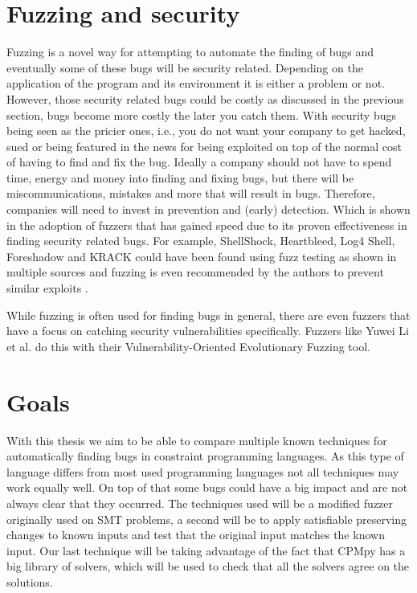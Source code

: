 \section{Fuzzing and security}
\label{intro:FussingSecurity}
Fuzzing is a novel way for attempting to automate the finding of bugs and eventually some of these bugs will be security related. Depending on the application of the program and its environment it is either a problem or not. However, those security related bugs could be costly as discussed in the previous section, bugs become more costly the later you 
catch them. With security bugs being seen as the pricier ones, i.e., you do not want your company to get hacked, sued or being featured in the news for being exploited on top of the normal cost of having to find and fix the bug. %
Ideally a company should not have to spend time, energy and money into finding and fixing bugs, but there will be miscommunications, mistakes and more that will result in bugs. Therefore, companies will need to invest in prevention and (early) detection. Which is shown in the adoption of fuzzers that has gained speed due to its proven effectiveness in finding security related bugs. For example, ShellShock, Heartbleed, Log4 Shell, Foreshadow and KRACK could have been found using fuzz testing as shown in multiple sources \cite{HeartbleedViaFuzzing, 34ForeshadowViaFuzz, ShellShockViaFuzzing, Log4ShellViaFuzzing} and fuzzing is even recommended by the authors to prevent similar exploits \cite{35ForeshadowFuzzRecom, 33KrackViaFuzz}.

While fuzzing is often used for finding bugs in general, there are even fuzzers that have a focus on catching security vulnerabilities specifically. Fuzzers like Yuwei Li et al. \cite{32V-Fuzz} do this with their Vulnerability-Oriented Evolutionary Fuzzing tool.

\section{Goals}
\label{intro:Goals}
With this thesis we aim to be able to compare multiple known techniques for automatically finding bugs in constraint programming languages. As this type of language differs from most used programming languages not all techniques may work equally well. On top of that some bugs could have a big impact and are not always clear that they occurred.
The techniques used will be a modified fuzzer originally used on SMT problems, a second will be to apply satisfiable preserving changes to known inputs and test that the original input matches the known input. Our last technique will be taking advantage of the fact that CPMpy has a big library of solvers, which will be used to check that all the solvers agree on the solutions.

